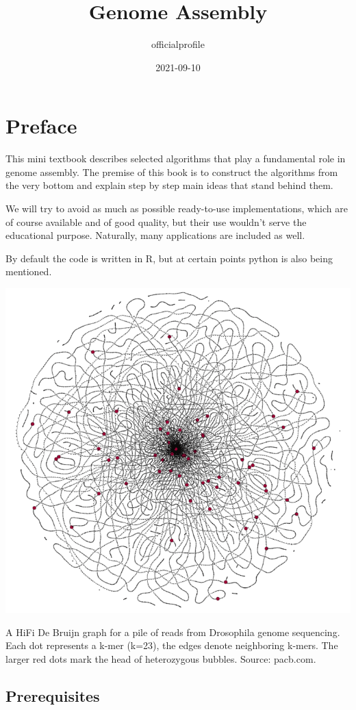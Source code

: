 \documentclass[
]{book}
\title{Genome Assembly}
\author{officialprofile}
\date{2021-09-10}
\begin{document}
\maketitle

{
\setcounter{tocdepth}{1}
\tableofcontents
}
\hypertarget{preface}{%
\chapter{Preface}\label{preface}}

This mini textbook describes selected algorithms that play a fundamental role in genome assembly. The premise of this book is to construct the algorithms from the very bottom and explain step by step main ideas that stand behind them.

We will try to avoid as much as possible ready-to-use implementations, which are of course available and of good quality, but their use wouldn't serve the educational purpose. Naturally, many applications are included as well.

By default the code is written in R, but at certain points python is also being mentioned.

\begin{center}\includegraphics[width=0.8\linewidth]{img/cover} \end{center}

A HiFi De Bruijn graph for a pile of reads from Drosophila genome sequencing. Each dot represents a k-mer (k=23), the edges denote neighboring k-mers. The larger red dots mark the head of heterozygous bubbles. Source: pacb.com.

\hypertarget{prerequisites}{%
\section{Prerequisites}\label{prerequisites}}
\end{document}
